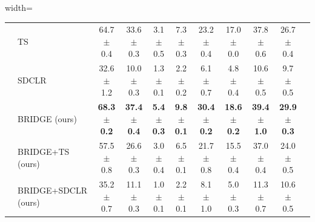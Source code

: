 \begin{table}[H]
\begin{adjustbox}{width=\textwidth}
\begin{tabular}{l l c c c c c c c c c}
 & TS & 64.7 {\scriptsize$\pm$ 0.4} & 33.6 {\scriptsize$\pm$ 0.3} & 3.1 {\scriptsize$\pm$ 0.5} & 7.3 {\scriptsize$\pm$ 0.3} & 23.2 {\scriptsize$\pm$ 0.4} & 17.0 {\scriptsize$\pm$ 0.0} & 37.8 {\scriptsize$\pm$ 0.6} & 26.7 {\scriptsize$\pm$ 0.4} \\
 & SDCLR & 32.6 {\scriptsize$\pm$ 1.2} & 10.0 {\scriptsize$\pm$ 0.3} & 1.3 {\scriptsize$\pm$ 0.1} & 2.2 {\scriptsize$\pm$ 0.2} & 6.1 {\scriptsize$\pm$ 0.7} & 4.8 {\scriptsize$\pm$ 0.4} & 10.6 {\scriptsize$\pm$ 0.5} & 9.7 {\scriptsize$\pm$ 0.5} \\
 & BRIDGE (ours) & \textbf{68.3 {\scriptsize$\pm$ 0.2}} & \textbf{37.4 {\scriptsize$\pm$ 0.4}} & \textbf{5.4 {\scriptsize$\pm$ 0.3}} & \textbf{9.8 {\scriptsize$\pm$ 0.1}} & \textbf{30.4 {\scriptsize$\pm$ 0.2}} & \textbf{18.6 {\scriptsize$\pm$ 0.2}} & \textbf{39.4 {\scriptsize$\pm$ 1.0}} & \textbf{29.9 {\scriptsize$\pm$ 0.3}} \\
 & BRIDGE+TS (ours) & 57.5 {\scriptsize$\pm$ 0.8} & 26.6 {\scriptsize$\pm$ 0.3} & 3.0 {\scriptsize$\pm$ 0.4} & 6.5 {\scriptsize$\pm$ 0.1} & 21.7 {\scriptsize$\pm$ 0.8} & 15.5 {\scriptsize$\pm$ 0.4} & 37.0 {\scriptsize$\pm$ 0.4} & 24.0 {\scriptsize$\pm$ 0.5} \\
 & BRIDGE+SDCLR (ours) & 35.2 {\scriptsize$\pm$ 0.7} & 11.1 {\scriptsize$\pm$ 0.3} & 1.0 {\scriptsize$\pm$ 0.1} & 2.2 {\scriptsize$\pm$ 0.1} & 8.1 {\scriptsize$\pm$ 1.0} & 5.0 {\scriptsize$\pm$ 0.3} & 11.3 {\scriptsize$\pm$ 0.7} & 10.6 {\scriptsize$\pm$ 0.5} \\
\bottomrule
\end{tabular}
\end{adjustbox}
\end{table}
